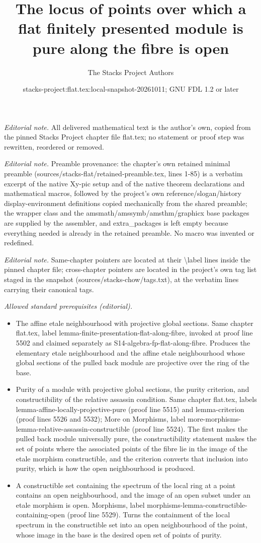 \documentclass[10pt,a4paper]{amsart}
\title{The locus of points over which a flat finitely presented module is pure along the fibre is open}
\author{The Stacks Project Authors}
\date{stacks-project:flat.tex:local-snapshot-20261011; GNU FDL 1.2 or later}
\theoremstyle{plain}
\theoremstyle{definition}
\theoremstyle{remark}
\numberwithin{equation}{subsection}
\begin{document}
\maketitle
\noindent\textit{Editorial note.} All delivered mathematical text is the author's own, copied from the pinned Stacks Project chapter file flat.tex; no statement or proof step was rewritten, reordered or removed.\par\medskip
\noindent\textit{Editorial note.} Preamble provenance: the chapter's own retained minimal preamble (sources/stacks-flat/retained-preamble.tex, lines 1-85) is a verbatim excerpt of the native Xy-pic setup and of the native theorem declarations and mathematical macros, followed by the project's own reference/slogan/history display-environment definitions copied mechanically from the shared preamble; the wrapper class and the amsmath/amssymb/amsthm/graphicx base packages are supplied by the assembler, and extra\_packages is left empty because everything needed is already in the retained preamble. No macro was invented or redefined.\par\medskip
\noindent\textit{Editorial note.} Same-chapter pointers are located at their \textbackslash{}label lines inside the pinned chapter file; cross-chapter pointers are located in the project's own tag list staged in the snapshot (sources/stacks-chow/tags.txt), at the verbatim lines carrying their canonical tags.\par\medskip
\noindent\textit{Allowed standard prerequisites (editorial).}\begin{itemize}
\item The affine etale neighbourhood with projective global sections. Same chapter flat.tex, label lemma-finite-presentation-flat-along-fibre, invoked at proof line 5502 and claimed separately as S14-algebra-fp-flat-along-fibre. Produces the elementary etale neighbourhood and the affine etale neighbourhood whose global sections of the pulled back module are projective over the ring of the base.
\item Purity of a module with projective global sections, the purity criterion, and constructibility of the relative assassin condition. Same chapter flat.tex, labels lemma-affine-locally-projective-pure (proof line 5515) and lemma-criterion (proof lines 5526 and 5532); More on Morphisms, label more-morphisms-lemma-relative-assassin-constructible (proof line 5524). The first makes the pulled back module universally pure, the constructibility statement makes the set of points where the associated points of the fibre lie in the image of the etale morphism constructible, and the criterion converts that inclusion into purity, which is how the open neighbourhood is produced.
\item A constructible set containing the spectrum of the local ring at a point contains an open neighbourhood, and the image of an open subset under an etale morphism is open. Morphisms, label morphisms-lemma-constructible-containing-open (proof line 5529). Turns the containment of the local spectrum in the constructible set into an open neighbourhood of the point, whose image in the base is the desired open set of points of purity.
\end{itemize}\medskip
\end{document}
